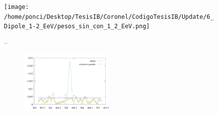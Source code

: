 \begin{figure}[htbp]
	\centering
	\texttt{[image: /home/ponci/Desktop/TesisIB/Coronel/CodigoTesisIB/Update/6\_Dipole\_1-2\_EeV/pesos\_sin\_con\_1\_2\_EeV.png]}
	\caption{Rayleigh con todos los disparos y la corrección de la colaboración}
	\label{fig:sucio}
--
\begin{figure}[H]
	\centering
	\includegraphics[width=0.5\textwidth]{sucio.pdf}
	\caption{ }
	\label{fig:label}
\end{figure}

\end{figure}